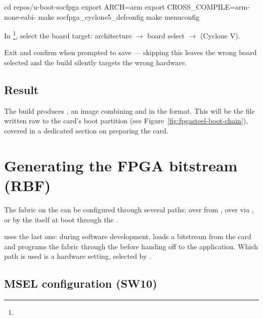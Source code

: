 \begin{shellcodehost}
cd repos/u-boot-socfpga
export ARCH=arm
export CROSS_COMPILE=arm-none-eabi-
make socfpga_cyclone5_defconfig
make menuconfig
\end{shellcodehost}

In \footnote{}, select the board target:  architecture $\rightarrow$   board select $\rightarrow$   (Cyclone V).

Exit and confirm  when prompted to save --- skipping this leaves the wrong board selected and the build silently targets the wrong hardware.


\subsection{Result}
\label{subsec:fpgasteel-build-result}

The build produces , an image combining  and  in the   format. This will be the file written raw to the  card's boot partition (see Figure~\ref{fig:fpgasteel-boot-chain}), covered in a dedicated section on preparing the  card.

\section{Generating the FPGA bitstream (RBF)}
\label{sec:fpgasteel-generating-bitstream}

The  fabric on the  can be configured through several paths: over  from , over  via , or by the  itself at boot through the .

 uses the last one: during software development,  loads a bitstream from the  card and programs the fabric through the  before handing off to the application. Which path is used is a hardware setting, selected by .

\subsection{MSEL configuration (SW10)}
\label{subsec:fpgasteel-msel}

